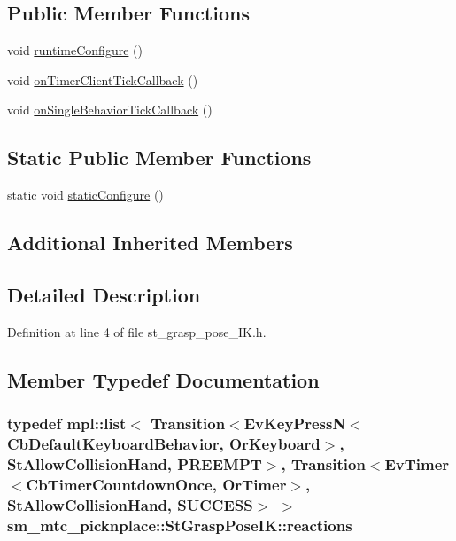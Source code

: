 \subsection*{Public Member Functions}
\begin{DoxyCompactItemize}
\item 
void \hyperlink{structsm__mtc__picknplace_1_1StGraspPoseIK_a32dfaaa38702efb00334200eeae6809b}{runtime\+Configure} ()
\item 
void \hyperlink{structsm__mtc__picknplace_1_1StGraspPoseIK_aa1ad4e3b00f88e9d54fc1dca178c12e0}{on\+Timer\+Client\+Tick\+Callback} ()
\item 
void \hyperlink{structsm__mtc__picknplace_1_1StGraspPoseIK_a5b338a999f3dfb502fbb426ed81f9df3}{on\+Single\+Behavior\+Tick\+Callback} ()
\end{DoxyCompactItemize}
\subsection*{Static Public Member Functions}
\begin{DoxyCompactItemize}
\item 
static void \hyperlink{structsm__mtc__picknplace_1_1StGraspPoseIK_a24e3893d657cffb288244dbc6ac8654f}{static\+Configure} ()
\end{DoxyCompactItemize}
\subsection*{Additional Inherited Members}


\subsection{Detailed Description}


Definition at line 4 of file st\+\_\+grasp\+\_\+pose\+\_\+\+I\+K.\+h.



\subsection{Member Typedef Documentation}
\subsubsection[{\texorpdfstring{reactions}{reactions}}]{\setlength{\rightskip}{0pt plus 5cm}typedef mpl\+::list$<$ Transition$<$Ev\+Key\+PressN$<$Cb\+Default\+Keyboard\+Behavior, {\bf Or\+Keyboard}$>$, {\bf St\+Allow\+Collision\+Hand}, {\bf P\+R\+E\+E\+M\+PT}$>$, Transition$<$Ev\+Timer$<$Cb\+Timer\+Countdown\+Once, {\bf Or\+Timer}$>$, {\bf St\+Allow\+Collision\+Hand}, {\bf S\+U\+C\+C\+E\+SS}$>$ $>$ {\bf sm\+\_\+mtc\+\_\+picknplace\+::\+St\+Grasp\+Pose\+I\+K\+::reactions}}\hypertarget{structsm__mtc__picknplace_1_1StGraspPoseIK_a4361a9c922d0d3e8469b7c2a9a3bdc49}{}\label{structsm__mtc__picknplace_1_1StGraspPoseIK_a4361a9c922d0d3e8469b7c2a9a3bdc49}



